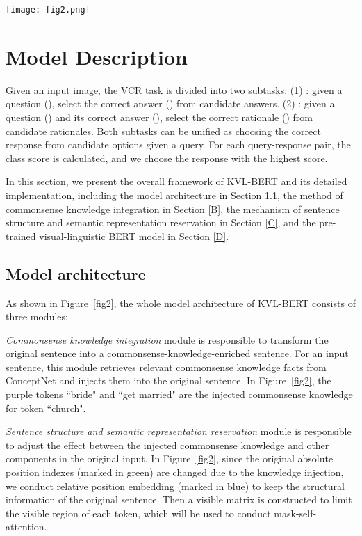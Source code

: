 \documentclass[conference]{IEEEtran}
\begin{document}
\begin{figure*}[t]
  \centering
  \texttt{[image: fig2.png]}\\
  \caption{The architecture of KVL-BERT.}
  \label{fig2}
\end{figure*}

\section{Model Description}

Given an input image, the VCR task is divided into two subtasks: (1) : given a question (), select  the correct answer () from candidate answers. (2) : given a question () and its correct answer (), select the correct rationale () from candidate rationales. Both subtasks can be unified as choosing the correct response from candidate options given a query. For each query-response pair, the class score is calculated, and we choose the response with the highest score.



In this section, we present the overall framework of KVL-BERT and its detailed implementation, including the model architecture in Section \ref{A},  the method of commonsense knowledge integration in Section \ref{B}, the mechanism of sentence structure and semantic representation reservation in Section \ref{C}, and the pre-trained visual-linguistic BERT model in Section \ref{D}.


\subsection{Model architecture}
\label{A}







As shown in Figure~\ref{fig2}, the whole model architecture of KVL-BERT consists of three modules:

\emph{Commonsense knowledge integration} module is responsible to transform the original sentence into a commonsense-knowledge-enriched sentence. For an input sentence, this module retrieves relevant commonsense knowledge facts from ConceptNet and injects them into the original sentence. In Figure~\ref{fig2}, the purple tokens “bride" and “get married" are the injected commonsense knowledge for token “church". 

\emph{Sentence structure and semantic representation reservation} module is responsible to adjust the effect between the injected commonsense knowledge and other components in the original input. In Figure~\ref{fig2}, since the original absolute position indexes (marked in green) are changed due to the knowledge injection, we conduct relative position embedding (marked in blue) to keep the structural information of the original sentence. Then a visible matrix is constructed to limit the visible region of each token, which will be used to conduct mask-self-attention.
\end{document}
